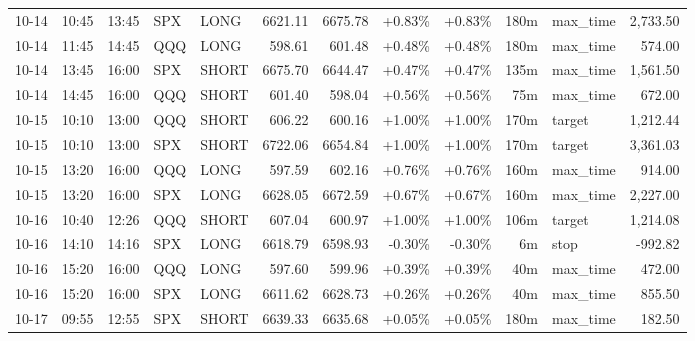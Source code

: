 \documentclass[11pt,a4paper]{article}
\begin{document}
\begin{center}
\begin{longtable}{>{\color{txtmain}}l l l l l r r r r r >{\color{txtmain}}l r}
10-14 & 10:45 & 13:45 & SPX & LONG & 6621.11 & 6675.78 & \textcolor{wingreen}{+0.83\%} & \textcolor{wingreen}{+0.83\%} & 180m & max\_time & \textcolor{wingreen}{2,733.50} \\
10-14 & 11:45 & 14:45 & QQQ & LONG & 598.61 & 601.48 & \textcolor{wingreen}{+0.48\%} & \textcolor{wingreen}{+0.48\%} & 180m & max\_time & \textcolor{wingreen}{574.00} \\
10-14 & 13:45 & 16:00 & SPX & SHORT & 6675.70 & 6644.47 & \textcolor{wingreen}{+0.47\%} & \textcolor{wingreen}{+0.47\%} & 135m & max\_time & \textcolor{wingreen}{1,561.50} \\
10-14 & 14:45 & 16:00 & QQQ & SHORT & 601.40 & 598.04 & \textcolor{wingreen}{+0.56\%} & \textcolor{wingreen}{+0.56\%} & 75m & max\_time & \textcolor{wingreen}{672.00} \\
10-15 & 10:10 & 13:00 & QQQ & SHORT & 606.22 & 600.16 & \textcolor{wingreen}{+1.00\%} & \textcolor{wingreen}{+1.00\%} & 170m & target & \textcolor{wingreen}{1,212.44} \\
10-15 & 10:10 & 13:00 & SPX & SHORT & 6722.06 & 6654.84 & \textcolor{wingreen}{+1.00\%} & \textcolor{wingreen}{+1.00\%} & 170m & target & \textcolor{wingreen}{3,361.03} \\
10-15 & 13:20 & 16:00 & QQQ & LONG & 597.59 & 602.16 & \textcolor{wingreen}{+0.76\%} & \textcolor{wingreen}{+0.76\%} & 160m & max\_time & \textcolor{wingreen}{914.00} \\
10-15 & 13:20 & 16:00 & SPX & LONG & 6628.05 & 6672.59 & \textcolor{wingreen}{+0.67\%} & \textcolor{wingreen}{+0.67\%} & 160m & max\_time & \textcolor{wingreen}{2,227.00} \\
10-16 & 10:40 & 12:26 & QQQ & SHORT & 607.04 & 600.97 & \textcolor{wingreen}{+1.00\%} & \textcolor{wingreen}{+1.00\%} & 106m & target & \textcolor{wingreen}{1,214.08} \\
10-16 & 14:10 & 14:16 & SPX & LONG & 6618.79 & 6598.93 & \textcolor{lossred}{-0.30\%} & \textcolor{lossred}{-0.30\%} & 6m & stop & \textcolor{lossred}{-992.82} \\
10-16 & 15:20 & 16:00 & QQQ & LONG & 597.60 & 599.96 & \textcolor{wingreen}{+0.39\%} & \textcolor{wingreen}{+0.39\%} & 40m & max\_time & \textcolor{wingreen}{472.00} \\
10-16 & 15:20 & 16:00 & SPX & LONG & 6611.62 & 6628.73 & \textcolor{wingreen}{+0.26\%} & \textcolor{wingreen}{+0.26\%} & 40m & max\_time & \textcolor{wingreen}{855.50} \\
10-17 & 09:55 & 12:55 & SPX & SHORT & 6639.33 & 6635.68 & \textcolor{wingreen}{+0.05\%} & \textcolor{wingreen}{+0.05\%} & 180m & max\_time & \textcolor{wingreen}{182.50} \\

\end{longtable}
\end{center}
\end{document}
